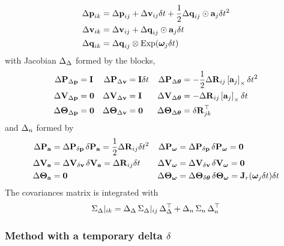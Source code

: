 \begin{align} \label{equ:integration}
\begin{split}
\Dp_{ik} 
&= \Dp_{ij} + \Dv_{ij}\dt + \frac12\Dq_{ij}\od\bfa_j\dt^2 \\
\Dv_{ik} 
&= \Dv_{ij} + \Dq_{ij}\od\bfa_j\dt \\
\Dq_{ik} 
&= \Dq_{ij}\ot\Exp(\bw_j\dt) 
\end{split}
\end{align}
%
with Jacobian $\D_\D$ formed by the blocks,
%
\begin{align*}
\DP_\Dp &= \bfI  & \DP_\Dv &= \bfI\dt & \DP_\Dth &= - \frac12\DR_{ij}  \hatx{\bfa_j}\dt^2 \\
\DV_\Dp &= \bf0  & \DV_\Dv &= \bfI & \DV_\Dth &= - \DR_{ij}  \hatx{\bfa_j}\dt \\
\DTH_\Dp &= \bf0  & \DTH_\Dv &= \bf0 & \DTH_\Dth &= \dR_{jk}\tr
\end{align*}
%
and $\D_n$ formed by
%
\begin{align*}
\DP_\bfa  &= \DP_\dpp \, \dP_\bfa = \frac12\DR_{ij}\dt^2 
& \DP_\bw &= \DP_\dpp\,\dP_\bw    = \bf0 \\
\DV_\bfa  &= \DV_\dv \, \dV_\bfa = \DR_{ij}\dt
& \DV_\bw &= \DV_\dv\,\dV_\bw = \bf0 \\
\DTH_\bfa  &= \bf0 
& \DTH_\bw &= \DTH_\dth \, \dTH_\bw = \bfJ_r(\bw_j\dt)\dt 
\end{align*}
%
The covariances matrix is integrated with
%
\begin{align}
\Sigma_\D|_{ik} = \D_\D\, \Sigma_\D|_{ij}\, \D_\D\tr + \D_n\, \Sigma_n \,\D_n\tr
\end{align}



\subsubsection{Method with a temporary delta $\delta$}

